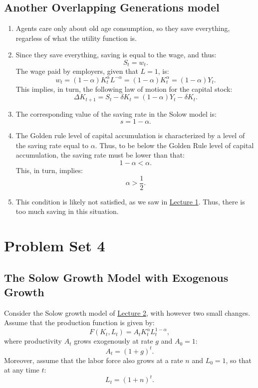 \documentclass[]{book}
\theoremstyle{definition}
\theoremstyle{definition}
\theoremstyle{definition}
\theoremstyle{remark}
\begin{document}
\section*{Another Overlapping Generations
model}\label{another-overlapping-generations-model-1}

\begin{enumerate}
\def\labelenumi{\arabic{enumi}.}
\item
  Agents care only about old age consumption, so they save everything,
  regarless of what the utility function is.
\item
  Since they save everything, saving is equal to the wage, and thus:
  \[S_t = w_t.\] The wage paid by employers, given that \(L=1\), is:
  \[w_{t}=(1-\alpha)K_{t}^{\alpha}L^{-\alpha}=(1-\alpha)K_{t}^{\alpha} = (1-\alpha)Y_t.\]
  This implies, in turn, the following law of motion for the capital
  stock:
  \[\Delta K_{t+1} = S_t - \delta K_t = (1-\alpha)Y_t-\delta K_t.\]
\item
  The corresponding value of the saving rate in the Solow model is:
  \[s = 1-\alpha.\]
\item
  The Golden rule level of capital accumulation is characterized by a
  level of the saving rate equal to \(\alpha\). Thus, to be below the
  Golden Rule level of capital accumulation, the saving rate must be
  lower than that: \[1-\alpha < \alpha.\] This, in turn, implies:
  \[\alpha > \frac{1}{2}.\]
\item
  This condition is likely not satisfied, as we saw in
  \protect\hyperlink{intro-cobb}{Lecture 1}. Thus, there is too much
  saving in this situation.
\end{enumerate}

\chapter{Problem Set 4}\label{pset4}

\section{The Solow Growth Model with Exogenous
Growth}\label{the-solow-growth-model-with-exogenous-growth}

Consider the Solow growth model of \protect\hyperlink{solow}{Lecture 2},
with however two small changes. Assume that the production function is
given by: \[F(K_t,L_t)=A_t K_t^{\alpha} L_t^{1-\alpha},\] where
productivity \(A_t\) grows exogenously at rate \(g\) and \(A_0=1\):
\[A_t=(1+g)^t.\] Moreover, assume that the labor force also grows at a
rate \(n\) and \(L_0=1\), so that at any time \(t\): \[ L_t = (1+n)^t.\]
\end{document}
